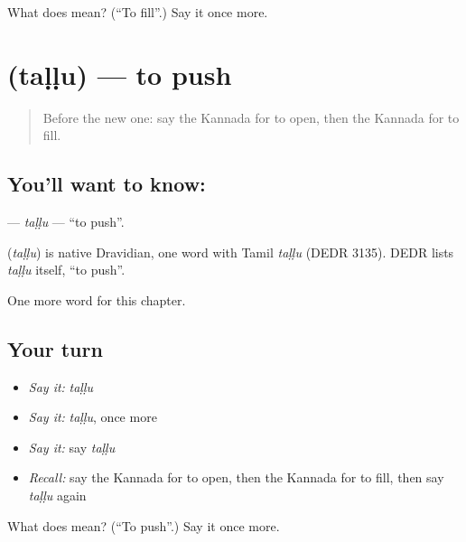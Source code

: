 \begin{tcolorbox}[breakable,colback=teal!4,colframe=teal!35!black,title={Before you move on}]
What does  mean? (\textquotedblleft{}To fill\textquotedblright{}.) Say it once more.
\end{tcolorbox}
\section[\texorpdfstring{\kn{ತಳ್ಳು} (taḷḷu)}{ತಳ್ಳು (taḷḷu)}]{ (taḷḷu) — to push}

\label{lesson:KA-C153-tallu}



\begin{quote}
Before the new one: say the Kannada for to open, then the Kannada for to fill.
\end{quote}

\subsection*{You'll want to know: }
\textbf{} — \emph{taḷḷu} — \textquotedblleft{}to push\textquotedblright{}.

\begin{cousinweb}
\textbf{} (\emph{taḷḷu}) is native Dravidian, one word with Tamil \emph{taḷḷu} (DEDR 3135). DEDR lists \emph{taḷḷu} itself, \textquotedblleft{}to push\textquotedblright{}.
\end{cousinweb}

\begin{grammarlens}[title={What you've built}]
One more word for this chapter.
\end{grammarlens}

\subsection*{Your turn}
\begin{itemize}
\raggedright
  \item \emph{Say it:} \emph{taḷḷu}
  \item \emph{Say it:} \emph{taḷḷu}, once more
  \item \emph{Say it:} say \emph{taḷḷu}
  \item \emph{Recall:} say the Kannada for to open, then the Kannada for to fill, then say \emph{taḷḷu} again
\end{itemize}

\begin{tcolorbox}[breakable,colback=teal!4,colframe=teal!35!black,title={Before you move on}]
What does  mean? (\textquotedblleft{}To push\textquotedblright{}.) Say it once more.
\end{tcolorbox}
